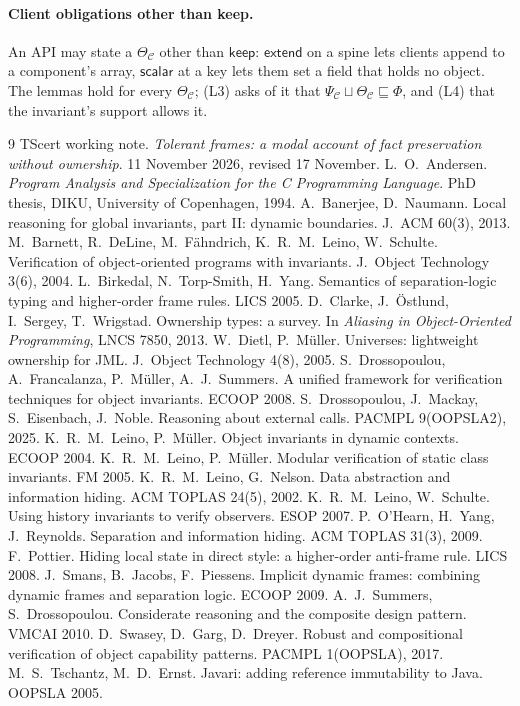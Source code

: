 \documentclass[10pt,a4paper]{article}
\theoremstyle{definition}
\theoremstyle{remark}
\newcommand{\kw}[1]{\mathsf{#1}}
\newcommand{\keep}{\kw{keep}}
\newcommand{\extend}{\kw{extend}}
\newcommand{\cC}{\mathcal{C}}
\begin{document}
\paragraph{Client obligations other than keep.} An API may state a
$\Theta_\cC$ other than $\keep$: $\extend$ on a spine lets clients append
to a component's array, $\kw{scalar}$ at a key lets them set a field
that holds no object. The lemmas hold for every $\Theta_\cC$; (L3) asks
of it that $\Psi_\cC\sqcup\Theta_\cC\sqsubseteq\Phi$, and (L4) that the
invariant's support allows it.



\begin{thebibliography}{9}\small\itemsep1pt
 TScert working note. \emph{Tolerant frames: a modal account of fact preservation without ownership}. 11 November 2026, revised 17 November.
 L.~O.~Andersen. \emph{Program Analysis and Specialization for the C Programming Language}. PhD thesis, DIKU, University of Copenhagen, 1994.
 A.~Banerjee, D.~Naumann. Local reasoning for global invariants, part II: dynamic boundaries. J.~ACM 60(3), 2013.
 M.~Barnett, R.~DeLine, M.~F\"ahndrich, K.~R.~M.~Leino, W.~Schulte. Verification of object-oriented programs with invariants. J.~Object Technology 3(6), 2004.
 L.~Birkedal, N.~Torp-Smith, H.~Yang. Semantics of separation-logic typing and higher-order frame rules. LICS 2005.
 D.~Clarke, J.~\"Ostlund, I.~Sergey, T.~Wrigstad. Ownership types: a survey. In \emph{Aliasing in Object-Oriented Programming}, LNCS 7850, 2013.
 W.~Dietl, P.~M\"uller. Universes: lightweight ownership for JML. J.~Object Technology 4(8), 2005.
 S.~Drossopoulou, A.~Francalanza, P.~M\"uller, A.~J.~Summers. A unified framework for verification techniques for object invariants. ECOOP 2008.
 S.~Drossopoulou, J.~Mackay, S.~Eisenbach, J.~Noble. Reasoning about external calls. PACMPL 9(OOPSLA2), 2025.
 K.~R.~M.~Leino, P.~M\"uller. Object invariants in dynamic contexts. ECOOP 2004.
 K.~R.~M.~Leino, P.~M\"uller. Modular verification of static class invariants. FM 2005.
 K.~R.~M.~Leino, G.~Nelson. Data abstraction and information hiding. ACM TOPLAS 24(5), 2002.
 K.~R.~M.~Leino, W.~Schulte. Using history invariants to verify observers. ESOP 2007.
 P.~O'Hearn, H.~Yang, J.~Reynolds. Separation and information hiding. ACM TOPLAS 31(3), 2009.
 F.~Pottier. Hiding local state in direct style: a higher-order anti-frame rule. LICS 2008.
 J.~Smans, B.~Jacobs, F.~Piessens. Implicit dynamic frames: combining dynamic frames and separation logic. ECOOP 2009.
 A.~J.~Summers, S.~Drossopoulou. Considerate reasoning and the composite design pattern. VMCAI 2010.
 D.~Swasey, D.~Garg, D.~Dreyer. Robust and compositional verification of object capability patterns. PACMPL 1(OOPSLA), 2017.
 M.~S.~Tschantz, M.~D.~Ernst. Javari: adding reference immutability to Java. OOPSLA 2005.
\end{thebibliography}
\end{document}
